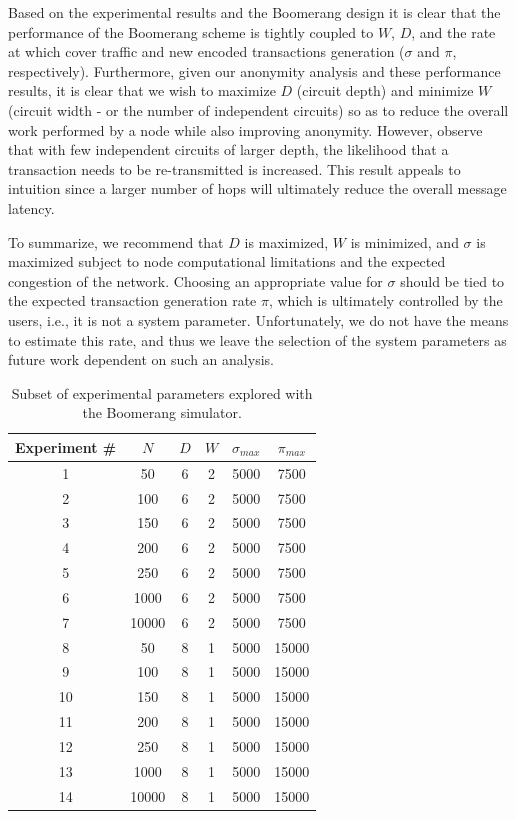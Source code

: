 Based on the experimental results and the Boomerang design it is clear that the performance of the Boomerang scheme is tightly coupled to $W$, $D$, and the rate at which cover traffic and new encoded transactions generation ($\sigma$ and $\pi$, respectively). Furthermore, given our anonymity analysis and these performance results, it is clear that we wish to maximize $D$ (circuit depth) and minimize $W$ (circuit width - or the number of independent circuits) so as to reduce the overall work performed by a node while also improving anonymity. However, observe that with few independent circuits of larger depth, the likelihood that a transaction needs to be re-transmitted is increased. This result appeals to intuition since a larger number of hops will ultimately reduce the overall message latency.

To summarize, we recommend that $D$ is maximized, $W$ is minimized, and $\sigma$ is maximized subject to node computational limitations and the expected congestion of the network. Choosing an appropriate value for $\sigma$ should be tied to the expected transaction generation rate $\pi$, which is ultimately controlled by the users, i.e., it is not a system parameter. Unfortunately, we do not have the means to estimate this rate, and thus we leave the selection of the system parameters as future work dependent on such an analysis. 

\begin{table}
\begin{center}
\caption{Subset of experimental parameters explored with the Boomerang simulator.}
\label{tab:experiments}
    \begin{tabular}{|c|c|c|c|c|c|} \hline
    {\bf Experiment \#} & $N$ & $D$ & $W$ & $\sigma_{max}$ & $\pi_{max}$ \\ \hline
    1 & 50     & 6 & 2 & 5000 & 7500 \\ 
    2 & 100    & 6 & 2 & 5000 & 7500 \\ 
    3 & 150    & 6 & 2 & 5000 & 7500 \\ 
    4 & 200    & 6 & 2 & 5000 & 7500 \\ 
    5 & 250    & 6 & 2 & 5000 & 7500 \\ 
    6 & 1000   & 6 & 2 & 5000 & 7500 \\ 
    7 & 10000  & 6 & 2 & 5000 & 7500 \\ 
    8 & 50     & 8 & 1 & 5000 & 15000 \\ 
    9 & 100    & 8 & 1 & 5000 & 15000 \\ 
    10 & 150   & 8 & 1 & 5000 & 15000 \\ 
    11 & 200   & 8 & 1 & 5000 & 15000 \\ 
    12 & 250   & 8 & 1 & 5000 & 15000 \\ 
    13 & 1000  & 8 & 1 & 5000 & 15000 \\ 
    14 & 10000 & 8 & 1 & 5000 & 15000 \\ 
    \hline
    \end{tabular}
\end{center}
\end{table}

